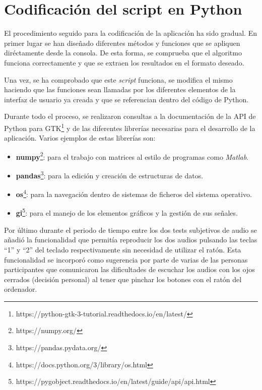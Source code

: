 \documentclass[11pt,a4paper,twoside]{book}
\begin{document}
        \section{Codificación del script en Python}            
            El procedimiento seguido para la codificación de la aplicación ha sido gradual. En primer lugar se han diseñado diferentes métodos y funciones que se apliquen diréctamente desde la consola. De esta forma, se comprueba que el algoritmo funciona correctamente y que se extraen los resultados en el formato deseado.
            
            Una vez, se ha comprobado que este \textit{script} funciona, se modifica el mismo haciendo que las funciones sean llamadas por los diferentes elementos de la interfaz de usuario ya creada y que se referencian dentro del código de Python.
            
            Durante todo el proceso, se realizaron consultas a la documentación de la API de Python para GTK\footnote{https://python-gtk-3-tutorial.readthedocs.io/en/latest/} y de las diferentes librerías necesarias para el desarrollo de la aplicación. Varios ejemplos de estas librerías son:
            \begin{itemize}
                \item \textbf{numpy}\footnote{https://numpy.org/}: para el trabajo con matrices al estilo de programas como \textit{Matlab}.
                \item \textbf{pandas}\footnote{https://pandas.pydata.org/}: para la edición y creación de estructuras de datos.
                \item \textbf{os}\footnote{https://docs.python.org/3/library/os.html}: para la navegación dentro de sistemas de ficheros del sistema operativo.
                \item \textbf{gi}\footnote{https://pygobject.readthedocs.io/en/latest/guide/api/api.html}: para el manejo de los elementos gráficos y la gestión de sus señales.
            \end{itemize}
            
            Por último durante el periodo de tiempo entre los dos tests subjetivos de audio se añadió la funcionalidad que permitía reproducir los dos audios pulsando las teclas ``1'' y ``2'' del teclado respectivamente sin necesidad de utilizar el ratón. Esta funcionalidad se incorporó como sugerencia por parte de varias de las personas participantes que comunicaron las dificultades de escuchar los audios con los ojos cerrados (decisión personal) al tener que pinchar los botones con el ratón del ordenador.
            
\end{document}
